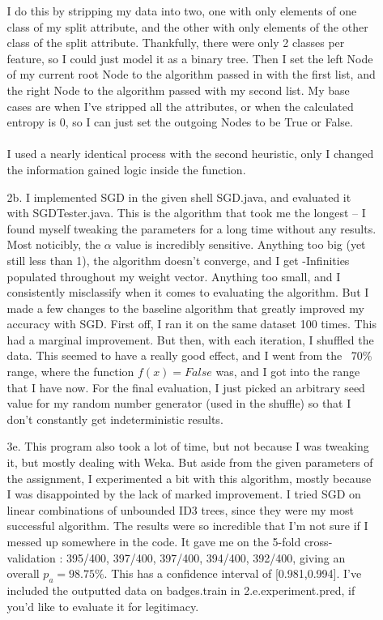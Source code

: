 \begin{enumerate}
\begin{enumerate}
                 I do this by stripping my data into two, one with only elements of one class of my split attribute, and the other with only elements of the other class of the split attribute. Thankfully, there were only 2 classes per feature, so I could just model it as a binary tree. Then I set the left Node of my current root Node to the algorithm passed in with the first list, and the right Node to the algorithm passed with my second list. My base cases are when I've stripped all the attributes, or when the calculated entropy is 0, so I can just set the outgoing Nodes to be True or False.
\\\\
                I used a nearly identical process with the second heuristic, only I changed the information gained logic inside the function.               
        \item[2b.]
                I implemented SGD in the given shell SGD.java, and evaluated it with SGDTester.java. This is the algorithm that took me the longest -- I found myself tweaking the parameters for a long time without any results. Most noticibly, the $\alpha$ value is incredibly sensitive. Anything too big (yet still less than 1), the algorithm doesn't converge, and I get -Infinities populated throughout my weight vector. Anything too small, and I consistently misclassify when it comes to evaluating the algorithm. But I made a few changes to the baseline algorithm that greatly improved my accuracy with SGD. First off, I ran it on the same dataset 100 times. This had a marginal improvement. But then, with each iteration, I shuffled the data. This seemed to have a really good effect, and I went from the ~70\% range, where the function $f(x)=False$ was, and I got into the range that I have now. For the final evaluation, I just picked an arbitrary seed value for my random number generator (used in the shuffle) so that I don't constantly get indeterministic results.
       \item[3e.]
                This program also took a lot of time, but not because I was tweaking it, but mostly dealing with Weka. But aside from the given parameters of the assignment, I experimented a bit with this algorithm, mostly because I was disappointed by the lack of marked improvement. I tried SGD on linear combinations of unbounded ID3 trees, since they were my most successful algorithm. The results were so incredible that I'm not sure if I messed up somewhere in the code. It gave me on the 5-fold cross-validation : 395/400, 397/400, 397/400, 394/400, 392/400, giving an overall $p_a = 98.75\%$. This has a confidence interval of [0.981,0.994]. I've included the outputted data on badges.train in 2.e.experiment.pred, if you'd like to evaluate it for legitimacy.
                
      \end{enumerate}
\end{enumerate}



